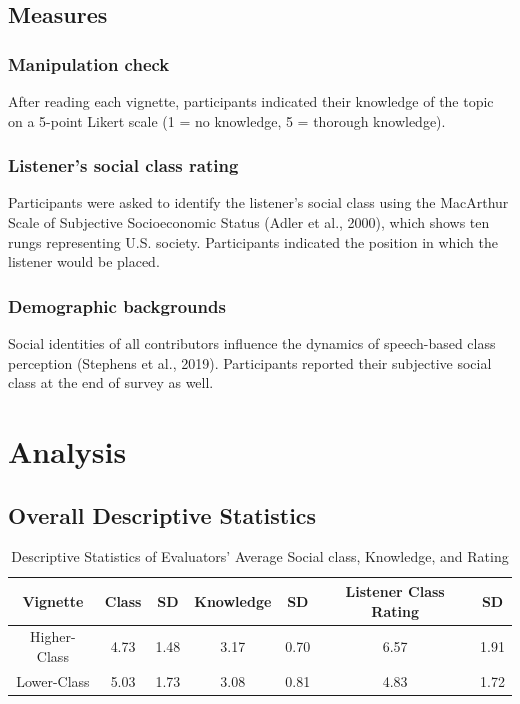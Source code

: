 \documentclass[
  man,floatsintext]{apa6}
\begin{document}
\hypertarget{measures}{%
\subsection{Measures}\label{measures}}

\hypertarget{manipulation-check}{%
\subsubsection{Manipulation check}\label{manipulation-check}}

After reading each vignette, participants indicated their knowledge of the topic on a 5-point Likert scale (1 = no knowledge, 5 = thorough knowledge).

\hypertarget{listeners-social-class-rating}{%
\subsubsection{Listener's social class rating}\label{listeners-social-class-rating}}

Participants were asked to identify the listener's social class using the MacArthur Scale of Subjective Socioeconomic Status (Adler et al., 2000), which shows ten rungs representing U.S. society. Participants indicated the position in which the listener would be placed.

\hypertarget{demographic-backgrounds}{%
\subsubsection{Demographic backgrounds}\label{demographic-backgrounds}}

Social identities of all contributors influence the dynamics of speech-based class perception (Stephens et al., 2019). Participants reported their subjective social class at the end of survey as well.

\hypertarget{analysis}{%
\section{Analysis}\label{analysis}}

\hypertarget{overall-descriptive-statistics}{%
\subsection{Overall Descriptive Statistics}\label{overall-descriptive-statistics}}

\begin{table}[!h]
\centering
\caption{\label{tab:descriptive-statistics}Descriptive Statistics of Evaluators' Average Social class, Knowledge, and Rating}
\centering
\begin{tabular}[t]{ccccccc}
\toprule
Vignette & Class & SD & Knowledge & SD & Listener Class Rating & SD\\
\midrule
Higher-Class & 4.73 & 1.48 & 3.17 & 0.70 & 6.57 & 1.91\\
Lower-Class & 5.03 & 1.73 & 3.08 & 0.81 & 4.83 & 1.72\\
\bottomrule
\end{tabular}
\end{table}
\end{document}

